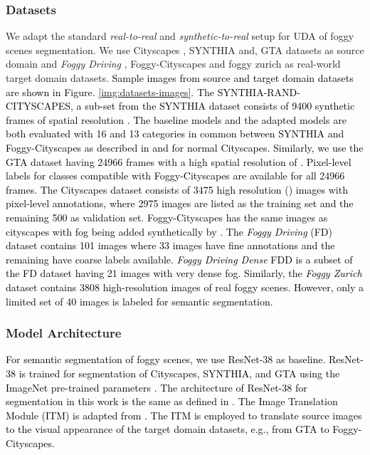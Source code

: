 \documentclass[final,5p,times,twocolumn]{elsarticle}
\begin{document}
\subsubsection{Datasets}
We adapt the standard \textit{real-to-real} and \textit{synthetic-to-real} setup for UDA of foggy scenes segmentation. We use Cityscapes \cite{Cordts2016Cityscapes}, SYNTHIA \cite{Ros_2016_CVPR} and, GTA \cite{Richter_2016_ECCV} datasets as source domain and  \textit{Foggy Driving} \cite{sakaridis2018semantic}, Foggy-Cityscapes \cite{sakaridis2018semantic} and foggy zurich \cite{dai2019curriculum} as real-world target domain datasets.  
\textcolor{black}{Sample images from source and target domain datasets are shown in Figure. \ref{img:datasets-images}. }
\textcolor{black}{
The SYNTHIA-RAND-CITYSCAPES, a sub-set from the SYNTHIA dataset consists of 9400 synthetic frames of spatial resolution . The baseline models and the adapted models are both evaluated with 16 and 13 categories in common between SYNTHIA and Foggy-Cityscapes as described in \cite{vu2019advent} and \cite{zou2018unsupervised} for normal Cityscapes.
Similarly, we use the GTA dataset having 24966 frames with a high spatial resolution of . Pixel-level labels for classes compatible with Foggy-Cityscapes are available for all 24966 frames.
The Cityscapes dataset consists of 3475 high resolution () images with pixel-level annotations, where 2975 images are listed as the training set and the remaining 500 as validation set. Foggy-Cityscapes has the same images as cityscapes with fog being added synthetically by \cite{sakaridis2018model}. 
\textcolor{black}{The \textit{Foggy Driving} (FD) dataset contains 101 images where 33 images have fine annotations and the remaining have coarse labels available. \textit{Foggy Driving Dense} FDD is a subset of the FD dataset having 21 images with very dense fog.}
Similarly, the \textit{Foggy Zurich} dataset contains 3808 high-resolution images of real foggy scenes. However, only a limited set of 40 images is labeled for semantic segmentation.}


\subsubsection{Model Architecture}
\textcolor{black}{
For semantic segmentation of foggy scenes, we use ResNet-38 \cite{wu2019Resnet38} as baseline. ResNet-38 is trained for segmentation of Cityscapes, SYNTHIA, and GTA using the ImageNet pre-trained parameters \cite{russakovsky2015imagenet}.
The architecture of ResNet-38 for segmentation in this work is the same as defined in \cite{wu2019Resnet38, zou2018unsupervised}. 
The Image Translation Module (ITM) is adapted from \cite{hoffman2017cycada}. The ITM is employed to translate source images to the visual appearance of the target domain datasets, e.g., from GTA to Foggy-Cityscapes.}
\end{document}
